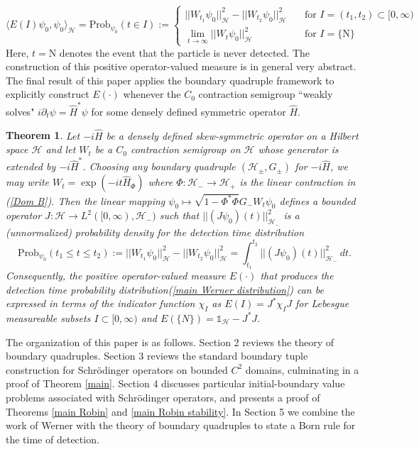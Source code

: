 \documentclass{article}
\numberwithin{equation}{section}
\newtheorem{theoremmain}{Theorem}
\begin{document}
\begin{equation}\label{main Werner distribution}
    \langle E(I)\psi_0,\psi_0\rangle_{\mathcal{H}}=\text{Prob}_{\psi_0}(t\in I):=\begin{cases}
        ||W_{t_1}\psi_0||_{\mathcal{H}}^2- ||W_{t_2}\psi_0||_{\mathcal{H}}^2 \quad &\text{for } I=(t_1,t_2)\subset[0,\infty)
        \\
        \lim_{t \to \infty}||W_{t}\psi_0||_{\mathcal{H}}^2 \quad &\text{for } I=\{\text{N} \}
    \end{cases}
\end{equation}
Here, $t=\text{N}$ denotes the event that the particle is never detected. The construction of this positive operator-valued measure is in general very abstract. The final result of this paper applies the boundary quadruple framework to explicitly construct $E(\cdot)$ whenever the $C_0$ contraction semigroup ``weakly solves" $i\partial_t\psi=\hat{H}^*\psi$ for some densely defined symmetric operator $\hat{H}$. 
\begin{theoremmain}\label{Born Rule Main}
    Let $-i\hat{H}$ be a densely defined skew-symmetric operator on a Hilbert space $\mathcal{H}$ and let $W_t$ be a $C_0$ contraction semigroup on $\mathcal{H}$ whose generator is extended by $-i\hat{H}^*$. Choosing any boundary quadruple $(\mathcal{H}_\pm, G_\pm)$ for $-i\hat{H}$, we may write $W_t=\exp(-it\hat{H}_\Phi)$ where $\Phi: \mathcal{H}_- \to \mathcal{H}_+$ is the linear contraction in (\ref{Dom B}). Then the linear mapping $\psi_0 \mapsto \sqrt{1-\Phi^*\Phi}G_-W_t\psi_0$ defines a bounded operator $J:\mathcal{H}\to L^2([0,\infty),\mathcal{H}_-)$ such that $||\left(J\psi_0\right) (t)||_{\mathcal{H_-}}^2$ is a (unnormalized) probability density for the detection time distribution \em 
    \begin{equation}
     \text{Prob}_{\psi_0}(t_1 \leq t \leq t_2):=||W_{t_1} \psi_0||_{\mathcal{H}}^2 - ||W_{t_2}\psi_0||_{\mathcal{H}}^2=\int_{t_1}^{t_2}||\left(J\psi_0\right) (t)||_{\mathcal{H}_-}^2 ~dt.
    \end{equation}
    \em Consequently, the positive operator-valued measure $E(\cdot)$ that produces the detection time probability distribution(\ref{main Werner distribution}) can be expressed in terms of the indicator function $\chi_I$ as $E(I)=J^*\chi_IJ$ for Lebesgue measureable subsets $I\subset [0,\infty)$ and $E(\{N\})=\mathds{1}_\mathcal{H}-J^*J$. 
\end{theoremmain}
The organization of this paper is as follows. Section 2 reviews the theory of boundary quadruples. Section 3 reviews the standard boundary tuple construction for Schr\"odinger operators on bounded $C^2$ domains, culminating in a proof of Theorem \ref{main}. Section 4 discusses particular initial-boundary value problems associated with Schr\"odinger operators, and presents a proof of Theorems \ref{main Robin} and \ref{main Robin stability}. In Section 5 we combine the work of Werner \cite{Werner1987} with the theory of boundary quadruples to state a Born rule for the time of detection.
\end{document}
